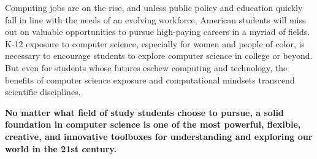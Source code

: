 Computing jobs are on the rise, and unless public policy and education quickly fall in line with the needs of an evolving workforce, American students will miss out on valuable opportunities to pursue high-paying careers in a myriad of fields. K-12 exposure to computer science, especially for women and people of color, is necessary to encourage students to explore computer science in college or beyond. But even for students whose futures eschew computing and technology, the benefits of computer science exposure and computational mindsets transcend scientific disciplines.\par
\textbf{No matter what field of study students choose to pursue, a solid foundation in computer science is one of the most powerful, flexible, creative, and innovative toolboxes for understanding and exploring our world in the 21st century.}\par





